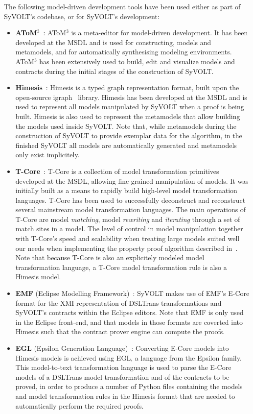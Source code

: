 The following model-driven development tools have been used either as part of
SyVOLT's codebase, or for SyVOLT's development:
\begin{itemize}
  \item \textbf{AToM$^3$}~\cite{}: AToM$^3$ is a meta-editor for model-driven
  development. It has been developed at the MSDL and is used for constructing,
  models and metamodels, and for automatically synthesising modeling
  environments.
  AToM$^3$ has been extensively used to build, edit and visualize models and
  contracts during the initial stages of the construction of SyVOLT.\\
  \item \textbf{Himesis}~\cite{}: Himesis is a typed graph representation
  format, built upon the open-source igraph~\cite{} library. Himesis has been
  developed at the MSDL and is used to represent all models manipulated by SyVOLT when a proof is being built.
  Himesis is also used to represent the metamodels that allow building the
  models used inside SyVOLT. Note that, while metamodels during the construction
  of SyVOLT to provide exemplar data for the algorithm, in the finished
  SyVOLT all models are automatically generated and metamodels only exist
  implicitely.\\
  \item \textbf{T-Core}~\cite{}: T-Core is a collection of model transformation
  primitives developed at the MSDL, allowing fine-grained manipulation of
  models. It was initially built as a means to rapidly build
  high-level model transformation languages. T-Core has been used to
  successfully deconstruct and reconstruct several mainstream model transformation
  languages. The main operations of T-Core are model \emph{matching}, model
  \emph{rewriting} and \emph{iterating} through a set of match sites in a model.
  The level of control in model manipulation together with T-Core's speed and
  scalability when treating large models suited well our needs when implementing
  the property proof algorithm described in~\cite{Lucio2014}. Note that because
  T-Core is also an explicitely modeled model transformation language, a T-Core
  model transformation rule is also a Himesis model.\\
  \item \textbf{EMF} (Eclipse Modelling Framework)~\cite{}: SyVOLT makes use of
  EMF's E-Core format for the XMI representation of DSLTrans transformations
  and SyVOLT's contracts within the Eclipse editors. Note that EMF is only used
  in the Eclipse front-end, and that models in those formats are coverted into
  Himesis such that the contract prover engine can compute the proofs.\\
  \item \textbf{EGL} (Epsilon Generation Language)~\cite{}: Converting E-Core
  models into Himesis models is achieved using EGL, a language from the Epsilon family. This
  model-to-text transformation language is used to parse the E-Core models of
  a DSLTrans model transformation and of the contracts to be proved, in order
  to produce a number of Python files containing the models and model
  transformation rules in the Himesis format that are needed to automatically
  perform the required proofs.


\end{itemize}
